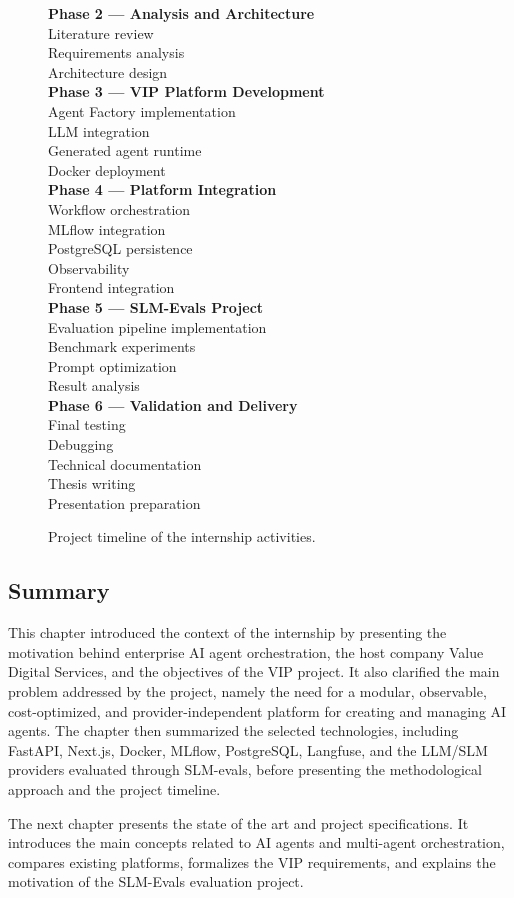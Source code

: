 \begin{figure}[H]
\begin{minipage}{0.95\textwidth}
        \textbf{Phase 2 --- Analysis and Architecture}\\
        Literature review\\
        Requirements analysis\\
        Architecture design\\[0.08cm]

        \textbf{Phase 3 --- VIP Platform Development}\\
        Agent Factory implementation\\
        LLM integration\\
        Generated agent runtime\\
        Docker deployment\\[0.08cm]

        \textbf{Phase 4 --- Platform Integration}\\
        Workflow orchestration\\
        MLflow integration\\
        PostgreSQL persistence\\
        Observability\\
        Frontend integration\\[0.08cm]

        \textbf{Phase 5 --- SLM-Evals Project}\\
        Evaluation pipeline implementation\\
        Benchmark experiments\\
        Prompt optimization\\
        Result analysis\\[0.08cm]

        \textbf{Phase 6 --- Validation and Delivery}\\
        Final testing\\
        Debugging\\
        Technical documentation\\
        Thesis writing\\
        Presentation preparation
    \end{minipage}
    \caption{Project timeline of the internship activities.}
    \label{fig:project_timeline}
\end{figure}

\subsection{Summary}

This chapter introduced the context of the internship by presenting the motivation behind enterprise AI agent orchestration, the host company Value Digital Services, and the objectives of the VIP project. It also clarified the main problem addressed by the project, namely the need for a modular, observable, cost-optimized, and provider-independent platform for creating and managing AI agents. The chapter then summarized the selected technologies, including FastAPI, Next.js, Docker, MLflow, PostgreSQL, Langfuse, and the LLM/SLM providers evaluated through SLM-evals, before presenting the methodological approach and the project timeline.

The next chapter presents the state of the art and project specifications. It introduces the main concepts related to AI agents and multi-agent orchestration, compares existing platforms, formalizes the VIP requirements, and explains the motivation of the SLM-Evals evaluation project.
